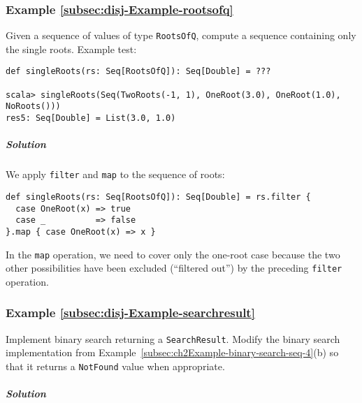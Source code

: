 \subsubsection{Example \label{subsec:disj-Example-rootsofq}\ref{subsec:disj-Example-rootsofq}}

Given a sequence of values of type \lstinline!RootsOfQ!, compute
a sequence containing only the single roots. Example test:
\begin{lstlisting}
def singleRoots(rs: Seq[RootsOfQ]): Seq[Double] = ???

scala> singleRoots(Seq(TwoRoots(-1, 1), OneRoot(3.0), OneRoot(1.0), NoRoots()))
res5: Seq[Double] = List(3.0, 1.0) 
\end{lstlisting}


\subparagraph{Solution}

We apply \lstinline!filter! and \lstinline!map! to the sequence
of roots:
\begin{lstlisting}
def singleRoots(rs: Seq[RootsOfQ]): Seq[Double] = rs.filter {
  case OneRoot(x) => true
  case _          => false
}.map { case OneRoot(x) => x }
\end{lstlisting}
In the \lstinline!map! operation, we need to cover only the one-root
case because the two other possibilities have been excluded (\textsf{``}filtered
out\textsf{''}) by the preceding \lstinline!filter! operation.

\subsubsection{Example \label{subsec:disj-Example-searchresult}\ref{subsec:disj-Example-searchresult}}

Implement binary search returning a \lstinline!SearchResult!. Modify
the binary search implementation from Example~\ref{subsec:ch2Example-binary-search-seq-4}(b)
so that it returns a \lstinline!NotFound! value when appropriate.

\subparagraph{Solution}

